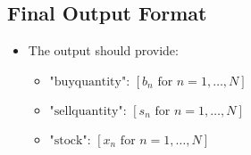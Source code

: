 \documentclass{article}
\begin{document}
\subsection*{Final Output Format}
\begin{itemize}
    \item The output should provide:
    \begin{itemize}
        \item \( \text{"buyquantity": } [b_n \text{ for } n = 1, \ldots, N] \)
        \item \( \text{"sellquantity": } [s_n \text{ for } n = 1, \ldots, N] \)
        \item \( \text{"stock": } [x_n \text{ for } n = 1, \ldots, N] \)
    \end{itemize}
\end{itemize}
\end{document}
